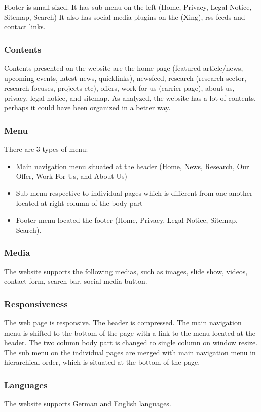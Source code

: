 Footer is small sized. It has sub menu on the left (Home, Privacy, Legal Notice, Sitemap, Search) It also has social media plugins on the (Xing), \ac{rss} feeds and contact links.

\subsubsection*{Contents}
Contents presented on the website are the home page (featured article/news, upcoming events, latest news, quicklinks), newsfeed, research (research sector, research focuses, projects etc), offers, work for us (carrier page), about us, privacy, legal notice, and sitemap. As analyzed, the website has a lot of contents, perhaps it could have been organized in a better way.

\subsubsection*{Menu}
There are 3 types of menu:
\begin{itemize}
\item Main navigation menu situated at the header (Home, News, Research, Our Offer, Work For Us, and About Us)
\item Sub menu respective to individual pages which is different from one another located at right column of the body part
\item Footer menu located the footer (Home, Privacy, Legal Notice, Sitemap, Search).
\end{itemize}

\subsubsection*{Media}
The website supports the following medias, such as images, slide show, videos, contact form, search bar, social media button.

\subsubsection*{Responsiveness}
The web page is responsive. The header is compressed. The main navigation menu is shifted to the bottom of the page with a link to the menu located at the header. The two column body part is changed to single column on window resize. The sub menu on the individual pages are merged with main navigation menu in hierarchical order, which is situated at the bottom of the page.

\subsubsection*{Languages}
The website supports German and English languages.


